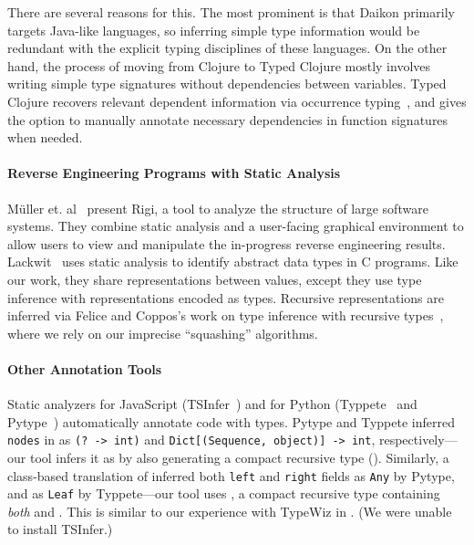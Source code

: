 There are several reasons for this. The most prominent is that Daikon
primarily targets Java-like languages, so inferring simple type information
would be redundant with the explicit typing disciplines of these languages.
On the other hand, the process of moving from Clojure to Typed Clojure
mostly involves writing simple type signatures without dependencies
between variables. Typed Clojure recovers relevant dependent information
via occurrence typing~, and gives the option to manually annotate necessary
dependencies in function signatures when needed.

\paragraph{Reverse Engineering Programs with Static Analysis}
M{\"u}ller et. al~ present Rigi, a tool to analyze
the structure of large software systems.
They combine static analysis 
and a user-facing graphical environment to allow users to view and manipulate
the in-progress reverse engineering results.
Lackwit~ uses static analysis to identify abstract 
data types in C programs. Like our work, they share representations between
values, except they use type inference with representations encoded as types.
Recursive representations are inferred via Felice and Coppos's
work on type inference with recursive types~,
where we rely on our imprecise ``squashing'' algorithms.


\paragraph{Other Annotation Tools}
Static analyzers
for JavaScript
(TSInfer~) and for Python (Typpete~
and Pytype~)
automatically annotate code with types.
Pytype and Typpete inferred \texttt{nodes} in 
as \texttt{(? -> int)}
and \texttt{Dict[(Sequence, object)] -> int}, respectively---our tool 
infers it as \clj{[Op -> Int]} by also generating a compact recursive
type ().
Similarly, a class-based translation of 
inferred both \texttt{left} and \texttt{right}
fields
as \texttt{Any} by Pytype, and as \texttt{Leaf} by Typpete---our tool
uses ,
a compact recursive type containing \emph{both}  and .
This is similar to our experience with TypeWiz in .
(We were unable to install TSInfer.)

